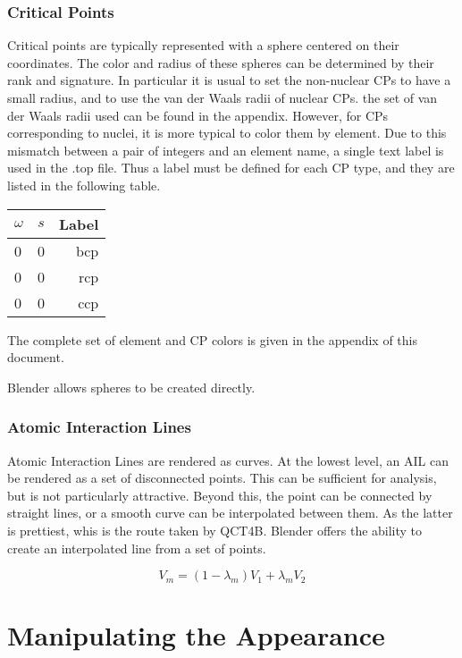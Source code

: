 \documentclass{report}
\begin{document}
\subsection{Critical Points}
Critical points are typically represented with a sphere centered on their coordinates.
The color and radius of these spheres can be determined by their rank and signature.
In particular it is usual to set the non-nuclear CPs to have a small radius, and to use the van der Waals radii of nuclear CPs.
the set of van der Waals radii used can be found in the appendix.
However, for CPs corresponding to nuclei, it is more typical to color them by element.
Due to this mismatch between a pair of integers and an element name, a single text label is used in the .top file.
Thus a label must be defined for each CP type, and they are listed in the following table.

\begin{tabular}{ l c || r }
$\omega$ & $s$ & Label \\
\hline
0 & 0 & bcp \\
0 & 0 & rcp \\
0 & 0 & ccp \\
\end{tabular}

The complete set of element and CP colors is given in the appendix of this document.

Blender allows spheres to be created directly.

\subsection{Atomic Interaction Lines}

Atomic Interaction Lines are rendered as curves.
At the lowest level, an AIL can be rendered as a set of disconnected points.
This can be sufficient for analysis, but is not particularly attractive.
Beyond this, the point can be connected by straight lines, or a smooth curve can be interpolated between them.
As the latter is prettiest, whis is the route taken by QCT4B.
Blender offers the ability to create an interpolated line from a set of points.

\begin{equation}
V_{m} = (1 - \lambda_{m}) V_{1} + \lambda_{m} V_{2}
\end{equation}

\chapter{Manipulating the Appearance}
\end{document}

